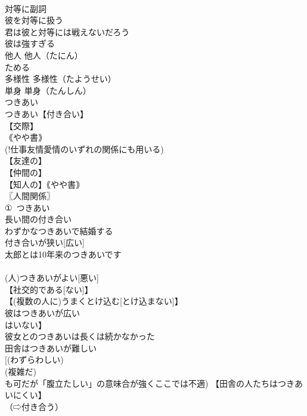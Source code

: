 \documentclass[8pt]{extreport}
\begin{document}
\begin{CJK}{UTF8}{min}
\\	対等に副詞
\\	彼を対等に扱う
\\	君は彼と対等には戦えないだろう
\\	彼は強すぎる
\\	他人		他人（たにん）
\\	ためる		
\\	多様性		多様性（たようせい）
\\	単身		単身（たんしん）
\\	つきあい		
\\	つきあい【付き合い】
\\	【交際】
\\	｟やや書｠
\\	(!仕事友情愛情のいずれの関係にも用いる) 
\\	【友達の】
\\	【仲間の】
\\	【知人の】｟やや書｠
\\	〖人間関係〗
\\	①~つきあい
\\	長い間の付き合い
\\	わずかなつきあいで結婚する
\\	付き合いが狭い[広い]
\\	太郎とは10年来のつきあいです
\\	[｟やや書｠ 
\\	と複数形に注意) 
\\	我々は会ったら話をする程度のつきあいです
\\	(!後の方が口語的)
\\	②つきあいが[は]
\\	(人)つきあいがよい[悪い]
\\	【社交的である[ない]】
\\	【(複数の人に)うまくとけ込む[とけ込まない]】
\\	彼はつきあいが広い
\\	[(多くの知人がある) 
\\	当方は暴力団とのつきあいはない
\\	【暴力団員に知人[友人]はいない】
\\	彼女とのつきあいは長くは続かなかった
\\	田舎はつきあいが難しい
\\	[(わずらわしい) 
\\	(複雑だ) 
\\	も可だが「腹立たしい」の意味合が強くここでは不適) 【田舎の人たちはつきあいにくい】
\\	（⇨付き合う）

\end{CJK}
\end{document}
